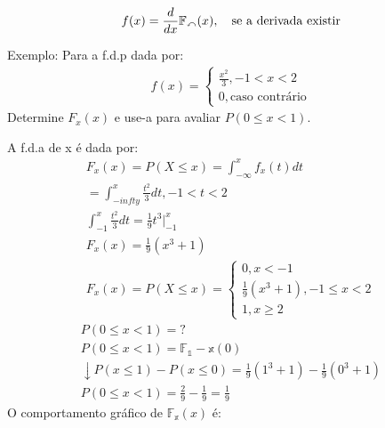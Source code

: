 \documentclass[11pt,a4paper]{article}
\begin{document}
\begin{align}
  f(x)=\frac{d}{dx}\mathbb{F_{x}}(x), \text{\quad se a derivada existir}
\end{align}

Exemplo: Para a f.d.p dada por: 
\begin{align*}
  f(x)= 
  \begin{cases}
    \frac{x^2}{3}, -1 < x < 2 \\
    0, \text{caso contrário}
  \end{cases}
\end{align*}
Determine $F_{x}(x)$ e use-a para avaliar $P(0 \le x< 1)$.

A f.d.a de x é dada por: 
\begin{align*}
  F_{x}(x)= P(X \le x)= \int_{-\infty}^{x} f_{x}(t) dt\\
  = \int_{-infty}^{x} \frac{t^2}{3} dt, -1<t<2 \\
  \int_{-1}^{x} \frac{t^2}{3} dt= \frac{1}{9} t^3 |^x_{-1}\\
  F_{x}(x)= \frac{1}{9}(x^3 +1)\\
  F_{x}(x)=P(X \le x)= 
  \begin{cases}
    0, x <-1 \\
    \frac{1}{9}(x^3 +1) , -1 \le x <2 \\
    1, x \geq 2
  \end{cases}
\end{align*}
\begin{align*}
  P(0 \le x <1)=? \\
  P(0 \le x <1)= \mathbb{F_{1}}- \mathbb{x}(0)\\
  \downarrow 
  P(x \le 1 ) - P(x \le 0)= \frac{1}{9} (1^3 + 1 ) - \frac{1}{9}(0^3+ 1)\\
  P(0 \le x < 1 )= \frac{2}{9} - \frac{1}{9} = \frac{1}{9}
\end{align*}
O comportamento gráfico de $\mathbb{F_{x}}(x)$ é: 
\end{document}
